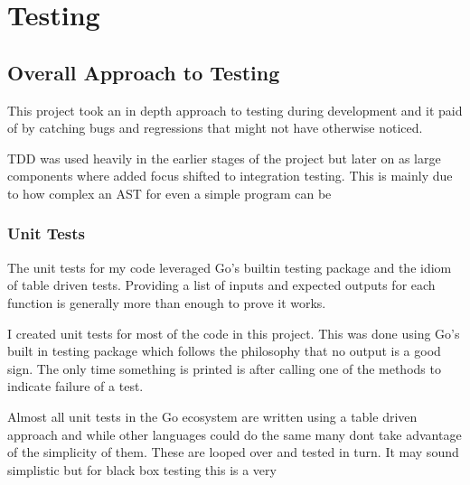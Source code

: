 \chapter{Testing}




\section{Overall Approach to Testing}
This project took an in depth approach to testing during development and it paid of by catching bugs and regressions that might not have otherwise noticed.

TDD was used heavily in the earlier stages of the project but later on as large components where added focus shifted to integration testing.
This is mainly due to how complex an AST for even a simple program can be


\subsection{Unit Tests}
The unit tests for my code leveraged Go's builtin testing package and the idiom of table driven tests.
Providing a list of inputs and expected outputs for each function is generally more than enough to prove it works.

I created unit tests for most of the code in this project.
This was done using Go's built in testing package which follows the philosophy that no output is a good sign. 
The only time something is printed is after calling one of the methods to indicate failure of a test.

Almost all unit tests in the Go ecosystem are written using a table driven approach and while other languages could do the same many dont take advantage of the simplicity of them.
These are looped over and tested in turn.
It may sound simplistic but for black box testing this is a very 

